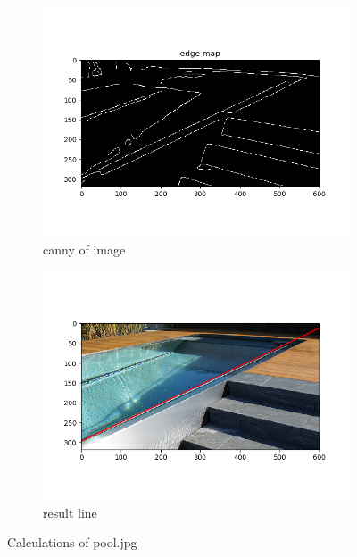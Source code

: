 \documentclass[12pt]{article}
\begin{document}
\begin{figure}[!htb]
  \vspace*{-1cm}
  \centering
  \begin{subfigure}{.5\textwidth}
    \centering
    \includegraphics[width=0.7\linewidth]{pics/hw3_ex_1_pool_canny}
    \caption{canny of image}
  \end{subfigure}%
  \begin{subfigure}{.5\textwidth}
    \centering
    \includegraphics[width=0.7\linewidth]{pics/hw3_ex_1_pool_result}
    \caption{result line}
   \end{subfigure}
  \caption{Calculations of pool.jpg}
\end{figure}
\end{document}

